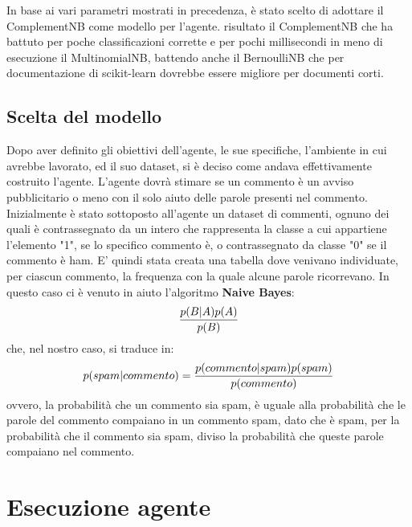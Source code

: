 \documentclass{report}
\begin{document}
                
    In base ai vari parametri mostrati in precedenza, è stato scelto di adottare il ComplementNB come modello per l'agente.
    risultato il ComplementNB che ha battuto per poche classificazioni corrette e per pochi millisecondi
        in meno di esecuzione il MultinomialNB, battendo anche il BernoulliNB che per documentazione 
        di scikit-learn dovrebbe essere migliore per documenti corti.

    
        \section{Scelta del modello}
    
        Dopo aver definito gli obiettivi dell'agente, le sue specifiche, l'ambiente in cui avrebbe lavorato, ed il suo dataset, si è deciso come andava effettivamente costruito l'agente.
        L'agente dovrà stimare se un commento è un avviso pubblicitario o meno con il solo aiuto delle parole presenti nel commento. Inizialmente è stato sottoposto all'agente 
        un dataset di commenti, ognuno dei quali è contrassegnato da un intero che rappresenta la classe a cui appartiene l'elemento "1", se lo specifico commento è, o contrassegnato da classe "0" se il commento è ham.
        E' quindi stata creata una tabella dove venivano individuate, per ciascun commento,
        la frequenza con la quale alcune parole ricorrevano. In questo caso ci è venuto in aiuto l'algoritmo {\bfseries Naive Bayes}:
        \newline
        \begin{equation}\label{bho}
            { p(B|A)  p(A)\over p(B)}
        \end{equation}
        \newline
        che, nel nostro caso, si traduce in:
        \newline
        \begin{equation}\label{bho2}
            p(spam|commento) = { p(commento|spam)  p(spam)\over p(commento)}
        \end{equation}
        \newline
        ovvero, la probabilità che un commento sia spam, è uguale alla probabilità che le parole del commento compaiano in un commento spam, dato che è spam, per la probabilità 
        che il commento sia spam, diviso la probabilità che queste parole compaiano nel commento.
    
    

    \chapter{Esecuzione agente}
    
\end{document}
